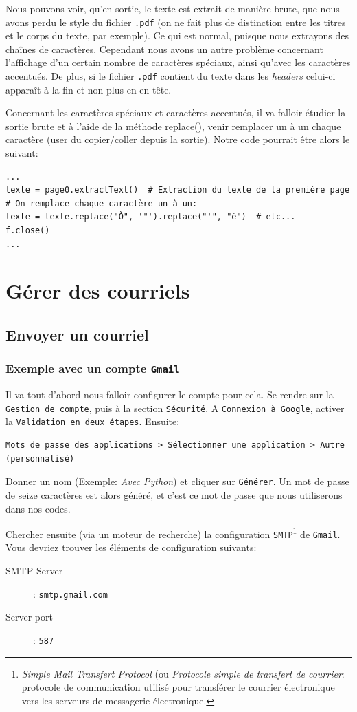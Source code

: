 \documentclass[a4paper,11pt]{book}
\begin{document}
Nous pouvons voir, qu'en sortie, le texte est extrait de manière brute, que nous avons perdu le style du fichier \texttt{.pdf} (on ne fait plus de distinction entre les titres et le corps du texte, par exemple). Ce qui est normal, puisque nous extrayons des chaînes de caractères.  Cependant nous avons un autre problème concernant l'affichage d'un certain nombre de caractères spéciaux, ainsi qu'avec les caractères accentués. De plus, si le fichier \texttt{.pdf} contient du texte dans les \textit{headers} celui-ci apparaît à la fin et non-plus en en-tête.
\medskip

Concernant les caractères spéciaux et caractères accentués, il va falloir étudier la sortie brute et à l'aide de la méthode replace(), venir remplacer un à un chaque caractère (user du copier/coller depuis la sortie). Notre code pourrait être alors le suivant:
\begin{lstlisting}
...
texte = page0.extractText()  # Extraction du texte de la première page
# On remplace chaque caractère un à un:
texte = texte.replace("Ò", '"').replace("'", "è")  # etc...
f.close()
...
\end{lstlisting}
\medskip

\chapter{Gérer des courriels}
\section{Envoyer un courriel}
\subsection*{Exemple avec un compte \texttt{Gmail}}
Il va tout d'abord nous falloir configurer le compte pour cela. Se rendre sur la \texttt{Gestion de compte}, puis à la section \texttt{Sécurité}. A \texttt{Connexion à Google}, activer la \texttt{Validation en deux étapes}. Ensuite: 
\begin{verbatim}
Mots de passe des applications > Sélectionner une application > Autre (personnalisé)
\end{verbatim}
\medskip

Donner un nom (Exemple: \og \textit{Avec Python}\fg{}) et cliquer sur \texttt{Générer}. Un mot de passe de seize caractères est alors généré, et c'est ce mot de passe que nous utiliserons dans nos codes.
\medskip

Chercher ensuite (via un moteur de recherche) la configuration \texttt{SMTP}\footnote{\textit{Simple Mail Transfert Protocol} (ou \textit{Protocole simple de transfert de courrier}: protocole de communication utilisé pour transférer le courrier électronique vers les serveurs de messagerie électronique.} de \texttt{Gmail}. Vous devriez trouver les éléments de configuration suivants:
\begin{description}
	\item[SMTP Server]: \texttt{smtp.gmail.com}
	\item[Server port]: \texttt{587}
\end{description}
\medskip
\end{document}

